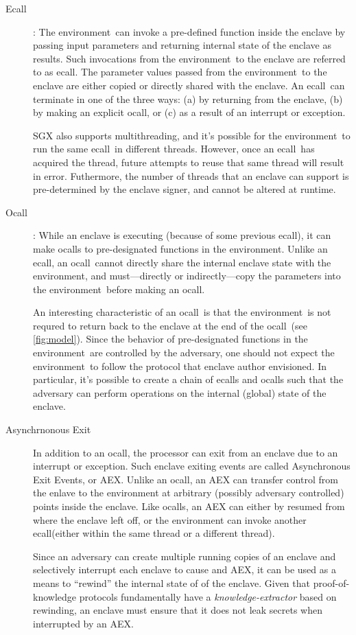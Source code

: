 \documentclass[11pt]{article}
\newcommand{\ecall}{\textsf{ecall}}
\newcommand{\ocall}{\textsf{ocall}}
\newcommand{\env}{\textsf{environment}}
\begin{document}
  \begin{description}
  \item[Ecall]: The \env\ can invoke a pre-defined function inside the
    enclave by passing input parameters and returning internal state
    of the enclave as results. Such invocations from the \env\ to the
    enclave are referred to as \ecall. The parameter values passed
    from the \env\ to the enclave are either copied or directly shared
    with the enclave. An \ecall\ can terminate in one of the three
    ways: (a) by returning from the enclave, (b) by making an explicit
    \ocall, or (c) as a result of an interrupt or exception.

    SGX also supports multithreading, and it's possible for the
    \env\ to run the same \ecall\ in different threads. However, once
    an \ecall\ has acquired the thread, future attempts to reuse that
    same thread will result in error. Futhermore, the number of
    threads that an enclave can support is pre-determined by the
    enclave signer, and cannot be altered at runtime.

  \item [Ocall]: While an enclave is executing (because of some
    previous \ecall), it can make \ocall s  to pre-designated
    functions in the \env.  Unlike an \ecall, an \ocall\ cannot
    directly share the internal enclave state with the \env, and
    must---directly or indirectly---copy the parameters into the
    \env\ before making an \ocall.

    An interesting characteristic of an \ocall\ is that the \env\ is
    not requred to return back to the enclave at the end of the
    \ocall\ (see \ref{fig:model}). Since the behavior of pre-designated
    functions in the \env\ are controlled by the adversary, one should
    not expect the \env\ to follow the protocol that enclave author
    envisioned. In particular, it's possible to create a chain of
    \ecall s and \ocall s such that the adversary can perform
    operations on the internal (global) state of the enclave.

  \item[Asynchrnonous Exit] In addition to an \ocall, the
    processor can exit from an enclave due to an interrupt or
    exception. Such enclave exiting events are called Asynchronous
    Exit Events, or AEX. Unlike an \ocall, an AEX can transfer control
    from the enlave to the environment at arbitrary (possibly adversary
    controlled) points inside the enclave. Like \ocall s, an AEX can
    either by resumed from where the enclave left off, or the
    environment can invoke another \ecall (either within the same
    thread or a different thread).

    Since an adversary can create multiple running copies of an
    enclave and selectively interrupt each enclave to cause and AEX,
    it can be used as a means to ``rewind'' the internal state of of
    the enclave. Given that proof-of-knowledge \cite{BellarePOK}
    protocols fundamentally have a \textit{knowledge-extractor} based
    on rewinding, an enclave must ensure that it does not leak secrets
    when interrupted by an AEX.

  \end{description}
\end{document}
